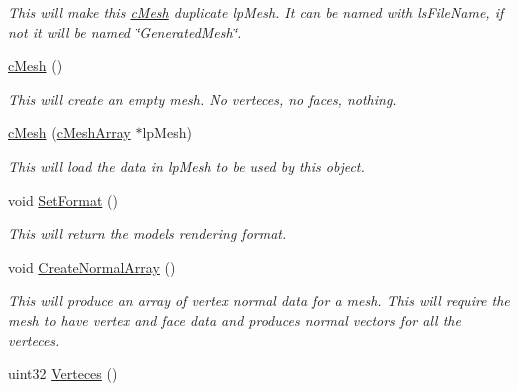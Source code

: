 \begin{DoxyCompactItemize}
\begin{DoxyCompactList}\small\item\em This will make this \hyperlink{classc_mesh}{cMesh} duplicate lpMesh. It can be named with lsFileName, if not it will be named \char`\"{}GeneratedMesh\char`\"{}. \end{DoxyCompactList}\item 
\hypertarget{classc_mesh_a1b689b9d00f34fe7e4cbf8910bb310f9}{
\hyperlink{classc_mesh_a1b689b9d00f34fe7e4cbf8910bb310f9}{cMesh} ()}
\label{classc_mesh_a1b689b9d00f34fe7e4cbf8910bb310f9}

\begin{DoxyCompactList}\small\item\em This will create an empty mesh. No verteces, no faces, nothing. \end{DoxyCompactList}\item 
\hypertarget{classc_mesh_ae24161941f8538d55caa144d76b535bc}{
\hyperlink{classc_mesh_ae24161941f8538d55caa144d76b535bc}{cMesh} (\hyperlink{classc_mesh_array}{cMeshArray} $\ast$lpMesh)}
\label{classc_mesh_ae24161941f8538d55caa144d76b535bc}

\begin{DoxyCompactList}\small\item\em This will load the data in lpMesh to be used by this object. \end{DoxyCompactList}\item 
\hypertarget{classc_mesh_a8dd2a8840d8e2c6aaefa95884a2f9f68}{
void \hyperlink{classc_mesh_a8dd2a8840d8e2c6aaefa95884a2f9f68}{SetFormat} ()}
\label{classc_mesh_a8dd2a8840d8e2c6aaefa95884a2f9f68}

\begin{DoxyCompactList}\small\item\em This will return the models rendering format. \end{DoxyCompactList}\item 
\hypertarget{classc_mesh_a5f35c2b9245d765b7958f91379d63e7d}{
void \hyperlink{classc_mesh_a5f35c2b9245d765b7958f91379d63e7d}{CreateNormalArray} ()}
\label{classc_mesh_a5f35c2b9245d765b7958f91379d63e7d}

\begin{DoxyCompactList}\small\item\em This will produce an array of vertex normal data for a mesh. This will require the mesh to have vertex and face data and produces normal vectors for all the verteces. \end{DoxyCompactList}\item 
\hypertarget{classc_mesh_a13513f988b641fb082e6e00d1e6c64e2}{
uint32 \hyperlink{classc_mesh_a13513f988b641fb082e6e00d1e6c64e2}{Verteces} ()}
\label{classc_mesh_a13513f988b641fb082e6e00d1e6c64e2}


\end{DoxyCompactItemize}
